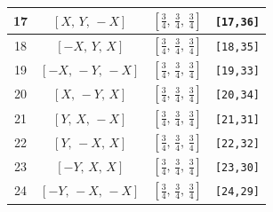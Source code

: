 \documentclass[fleqn,8pt]{jsarticle}
\begin{document}
\begin{longtable}{cccc}
17 & $\left[ X,\, Y,\, - X \right]$ & $\left[ \frac{3}{4},\, \frac{3}{4},\, \frac{3}{4} \right]$ & {\tt [17,36]} \\ \hline
18 & $\left[ - X,\, Y,\, X \right]$ & $\left[ \frac{3}{4},\, \frac{3}{4},\, \frac{3}{4} \right]$ & {\tt [18,35]} \\ \hline
19 & $\left[ - X,\, - Y,\, - X \right]$ & $\left[ \frac{3}{4},\, \frac{3}{4},\, \frac{3}{4} \right]$ & {\tt [19,33]} \\ \hline
20 & $\left[ X,\, - Y,\, X \right]$ & $\left[ \frac{3}{4},\, \frac{3}{4},\, \frac{3}{4} \right]$ & {\tt [20,34]} \\ \hline
21 & $\left[ Y,\, X,\, - X \right]$ & $\left[ \frac{3}{4},\, \frac{3}{4},\, \frac{3}{4} \right]$ & {\tt [21,31]} \\ \hline
22 & $\left[ Y,\, - X,\, X \right]$ & $\left[ \frac{3}{4},\, \frac{3}{4},\, \frac{3}{4} \right]$ & {\tt [22,32]} \\ \hline
23 & $\left[ - Y,\, X,\, X \right]$ & $\left[ \frac{3}{4},\, \frac{3}{4},\, \frac{3}{4} \right]$ & {\tt [23,30]} \\ \hline
24 & $\left[ - Y,\, - X,\, - X \right]$ & $\left[ \frac{3}{4},\, \frac{3}{4},\, \frac{3}{4} \right]$ & {\tt [24,29]} \\
\end{longtable}
\renewcommand{\arraystretch}{1.2}
\end{document}
